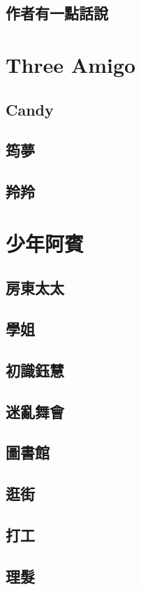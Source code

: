 \documentclass[hyperref]{ctexbook}
\begin{document}
\chapter*{作者有一點話說}
\part{Three Amigo}
\chapter{Candy}
\chapter{筠夢}
\chapter{羚羚}

\part{少年阿賓}
\chapter{房東太太}
\chapter{學姐}
\chapter{初識鈺慧}
\chapter{迷亂舞會}
\chapter{圖書館}
\chapter{逛街}
\chapter{打工}
\chapter{理髮}
\end{document}

